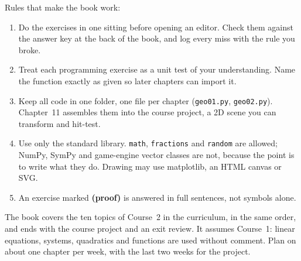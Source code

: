 \documentclass[11pt,letterpaper,openany]{book}
\begin{document}
Rules that make the book work:

\begin{enumerate}
\item Do the exercises in one sitting before opening an editor. Check them against the answer key at the back of the book, and log every miss with the rule you broke.
\item Treat each programming exercise as a unit test of your understanding. Name the function exactly as given so later chapters can import it.
\item Keep all code in one folder, one file per chapter (\lstinline!geo01.py!, \lstinline!geo02.py!). Chapter~11 assembles them into the course project, a 2D scene you can transform and hit-test.
\item Use only the standard library. \lstinline!math!, \lstinline!fractions! and \lstinline!random! are allowed; NumPy, SymPy and game-engine vector classes are not, because the point is to write what they do. Drawing may use matplotlib, an HTML canvas or SVG.
\item An exercise marked \textbf{(proof)} is answered in full sentences, not symbols alone.
\end{enumerate}

The book covers the ten topics of Course~2 in the curriculum, in the same order, and ends with the course project and an exit review. It assumes Course~1: linear equations, systems, quadratics and functions are used without comment. Plan on about one chapter per week, with the last two weeks for the project.

\cleardoublepage
\tableofcontents

\mainmatter
\pagestyle{body}













\backmatter
\pagestyle{body}


\end{document}
